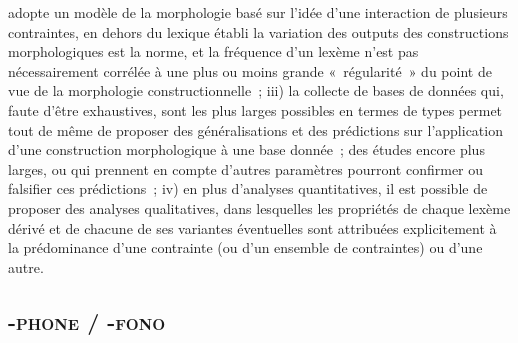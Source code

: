 \documentclass[output=paper]{langsci/langscibook}
\begin{document}
adopte un modèle de la morphologie basé sur l'idée d'une interaction de
plusieurs contraintes, en dehors du lexique établi la variation des
outputs des constructions morphologiques est la norme, et la fréquence
d'un lexème n'est pas nécessairement corrélée à une plus ou moins grande
«~régularité~» du point de vue de la morphologie constructionnelle~; iii)
la collecte de bases de données qui, faute d'être exhaustives, sont les
plus larges possibles en termes de types permet tout de même de proposer
des généralisations et des prédictions sur l'application d'une
construction morphologique à une base donnée~; des études encore plus
larges, ou qui prennent en compte d'autres paramètres pourront confirmer
ou falsifier ces prédictions~; iv) en plus d'analyses quantitatives, il
est possible de proposer des analyses qualitatives, dans lesquelles les
propriétés de chaque lexème dérivé et de chacune de ses variantes
éventuelles sont attribuées explicitement à la prédominance d'une
contrainte (ou d'un ensemble de contraintes) ou d'une autre.

\subsection{\textsc{-phone / -fono}}
\end{document}
